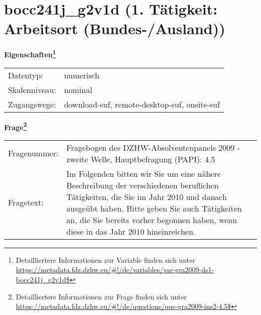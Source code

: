 
    \setcounter{footnote}{0}

    \vspace*{-1.8cm}
	\section{bocc241j\_g2v1d (1. Tätigkeit: Arbeitsort (Bundes-/Ausland))}
	\label{section:bocc241j_g2v1d}



    \vspace*{0.5cm}
    \noindent\textbf{Eigenschaften\footnote{Detailliertere Informationen zur Variable finden sich unter
		\url{https://metadata.fdz.dzhw.eu/\#!/de/variables/var-gra2009-ds1-bocc241j_g2v1d$}}}\\
	\begin{tabularx}{\hsize}{@{}lX}
	Datentyp: & numerisch \\
	Skalenniveau: & nominal \\
	Zugangswege: &
	  download-suf, 
	  remote-desktop-suf, 
	  onsite-suf
 \\
    \end{tabularx}



				\vspace*{0.5cm}
                \noindent\textbf{Frage\footnote{Detailliertere Informationen zur Frage finden sich unter
		              \url{https://metadata.fdz.dzhw.eu/\#!/de/questions/que-gra2009-ins2-4.5$}}}\\
				\begin{tabularx}{\hsize}{@{}lX}
					Fragenummer: &
					  Fragebogen des DZHW-Absolventenpanels 2009 - zweite Welle, Hauptbefragung (PAPI):
					  4.5
 \\
					Fragetext: & Im Folgenden bitten wir Sie um eine nähere Beschreibung der verschiedenen beruflichen Tätigkeiten, die Sie im Jahr 2010 und danach ausgeübt haben. Bitte geben Sie auch Tätigkeiten an, die Sie bereits vorher begonnen haben, wenn diese in das Jahr 2010 hineinreichen. \\
				\end{tabularx}





